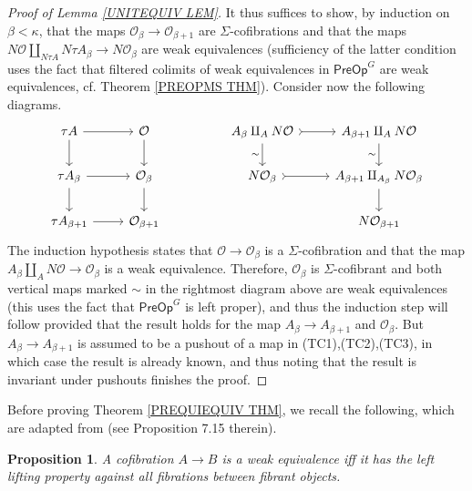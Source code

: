 \documentclass[a4paper,10pt]{article}%
\numberwithin{equation}{section}
\numberwithin{figure}{section}
\newtheorem{proposition}[equation]{Proposition}%
\theoremstyle{definition} %
\newcommand{\1}{\ensuremath{\mathbbm 1}}%
\begin{document}
\begin{proof}[Proof of Lemma \ref{UNITEQUIV LEM}]
	It thus suffices to show, by induction on $\beta < \kappa$, 
	that the maps $\mathcal{O}_{\beta} \to \mathcal{O}_{\beta + 1}$ are $\Sigma$-cofibrations and that the maps 
	$N \mathcal{O} \amalg_{N \tau A} N \tau A_{\beta}
	\to 
	N \mathcal{O}_{\beta}$
	are weak equivalences
	(sufficiency of the latter condition uses the fact that 
	filtered colimits of weak equivalences in $\mathsf{PreOp}^G$ are weak equivalences, cf. Theorem \ref{PREOPMS THM}).
	Consider now the following diagrams.
	\[
	\begin{tikzcd}
	\tau A \ar{r} \ar{d} & \mathcal{O} \ar{d}
	&&
	A_{\beta} \amalg_{A} N \mathcal{O}
	\ar[>->]{r} \ar{d}[swap]{\sim} &
	A_{\beta+1} \amalg_{A} N \mathcal{O}
	\ar{d}[swap]{\sim}
	\\
	\tau A_{\beta} \ar{r} \ar{d} & \mathcal{O}_{\beta} \ar{d}
	&&
	N \mathcal{O}_{\beta} \ar[>->]{r} &
	A_{\beta+1} \amalg_{A_{\beta}} N \mathcal{O}_{\beta} \ar{d}
	\\
	\tau A_{\beta + 1} \ar{r} & \mathcal{O}_{\beta + 1}
	&&
	&
	N \mathcal{O}_{\beta+1}
	\end{tikzcd}
	\]
	The induction hypothesis states that
	$\mathcal{O} \to \mathcal{O}_{\beta}$ is a $\Sigma$-cofibration and that the map
	$A_{\beta} \amalg_A N \mathcal{O} \to \mathcal{O}_{\beta}$ is a weak equivalence.
	Therefore, $\mathcal{O}_{\beta}$ is $\Sigma$-cofibrant 
	and both vertical maps marked $\sim$ in the rightmost diagram above are weak equivalences 
	(this uses the fact that $\mathsf{PreOp}^G$ is left proper),
	and thus the induction step will follow provided that the result holds for
	the map $A_{\beta} \to A_{\beta + 1}$ and $\mathcal{O}_{\beta}$.
	But $A_{\beta} \to A_{\beta + 1}$ is assumed to be a pushout of a map in (TC1),(TC2),(TC3), 
	in which case the result is already known, and thus noting that the result is invariant under pushouts finishes the proof.
\end{proof}




Before proving Theorem \ref{PREQUIEQUIV THM}, 
we recall the following,
which are adapted from \cite{JT07} (see Proposition 7.15 therein). 


\begin{proposition}
	A cofibration $A \to B$ is a weak equivalence iff it has the left lifting property against all fibrations between fibrant objects.
\end{proposition}
\end{document}
